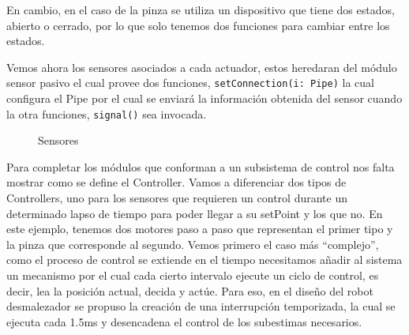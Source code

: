 En cambio, en el caso de la pinza se utiliza un dispositivo que tiene dos estados, abierto o cerrado, por lo que solo tenemos dos funciones para cambiar entre los estados.

\begin{figure}[h]
\begin{center}
\end{center}
\end{figure}

Vemos ahora los sensores asociados a cada actuador, estos heredaran del módulo sensor pasivo el cual provee dos funciones, \verb|setConnection(i: Pipe)| la cual configura el Pipe por el cual se enviará la información obtenida del sensor cuando la otra funciones, \verb|signal()| sea invocada.

\begin{figure}[h]
\caption{Sensores}
\begin{center}
\end{center}
\end{figure}

Para completar los módulos que conforman a un subsistema de control nos falta mostrar como se define el Controller. Vamos a diferenciar dos tipos de Controllers, uno para los sensores que requieren un control durante un determinado lapso de tiempo para poder llegar a su setPoint y los que no. En este ejemplo, tenemos dos motores paso a paso que representan el primer tipo y la pinza que corresponde al segundo. Vemos primero el caso más ``complejo'', como el proceso de control se extiende en el tiempo necesitamos añadir al sistema un mecanismo por el cual cada cierto intervalo ejecute un ciclo de control, es decir, lea la posición actual, decida y actúe. Para eso, en el diseño del robot desmalezador se propuso la creación de una interrupción temporizada, la cual se ejecuta cada 1.5ms y desencadena el control de los subestimas necesarios.


